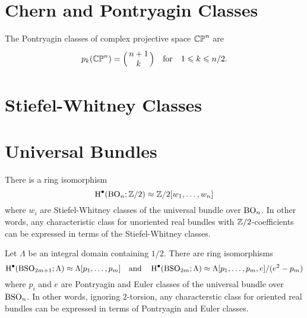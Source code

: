 
\section{Chern and Pontryagin Classes}

\begin{proposition}\label{prop:pontryagin_classes_of_CPn}
  The Pontryagin classes of complex projective space $\mathbb{CP}^n$ are
  \[
    p_k(\CP^n) = \binom{n+1}{k}\quad\textrm{for}\quad 1\leq k \leq n/2.
  \]
\end{proposition}

\section{Stiefel-Whitney Classes}\label{sec:stiefel-whitney_classes}

\section{Universal Bundles}\label{sec:universal_bundles}

\cite{milnorstasheff1974characteristic}
\cite{botttu1982differential}

\begin{theorem}\label{thm:cohomology_of_BO}
  There is a ring isomorphism
  \[
    \operatorname{H}^\bullet({\operatorname{BO}}_n; \mathbb{Z}/2) \approx \mathbb{Z}/2[w_1,\ldots, w_n]
  \]
  where $w_i$ are Stiefel-Whitney classes of the universal bundle over ${\operatorname{BO}}_n$. In other words, any characteristic class for unoriented real bundles with $\mathbb{Z}/2$-coefficients can be expressed in terms of the Stiefel-Whitney classes.
\end{theorem}

\begin{theorem}\label{thm:cohomology_of_BSO}
  Let $\Lambda$ be an integral domain containing $1/2$. There are ring isomorphisms
  \[
      \operatorname{H}^\bullet({\operatorname{BSO}}_{2m+1}; \Lambda) \approx \Lambda[p_1, \ldots, p_m]
      \quad\textrm{and}\quad
      \operatorname{H}^\bullet({\operatorname{BSO}}_{2m}; \Lambda) \approx \Lambda[p_1, \ldots, p_m, e]/(e^2-p_m)
  \]
  where $p_i$ and $e$ are Pontryagin and Euler classes of the universal bundle over ${\operatorname{BSO}}_n$.
  In other words, ignoring $2$-torsion, any characterstic class for oriented real bundles can be expressed in terms of Pontryagin and Euler classes.
\end{theorem}
